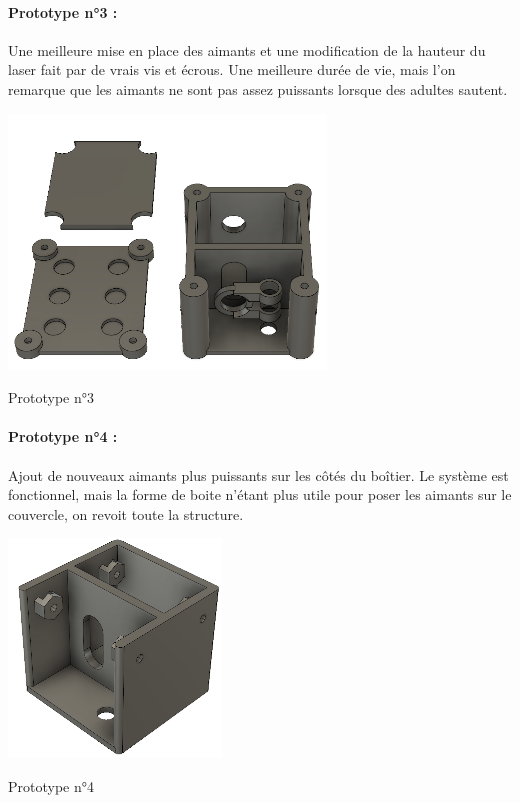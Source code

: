 \paragraph{Prototype n°3 :}
Une meilleure mise en place des aimants et une modification de la hauteur du laser fait par de vrais vis et écrous. Une meilleure durée de vie, mais l'on remarque que les aimants ne sont pas assez puissants lorsque des adultes sautent.
\begin{center}
    \includegraphics{photoHugo/image011}
    
    Prototype n°3
\end{center}

\paragraph{Prototype n°4 :}
Ajout de nouveaux aimants plus puissants sur les côtés du boîtier. Le système est fonctionnel, mais la forme de boite n’étant plus utile pour poser les aimants sur le couvercle, on revoit toute la structure.
\begin{center}
    \includegraphics{photoHugo/image013}
    
    Prototype n°4
\end{center}

